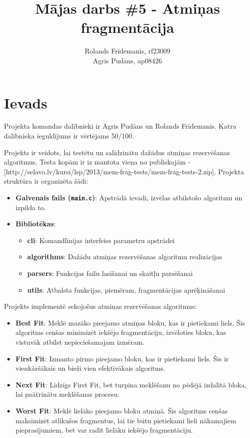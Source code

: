 \documentclass{report}
\title{Mājas darbs \#5 - Atmiņas fragmentācija}
\author{Rolands Frīdemanis, rf23009 \\ Agris Pudāns, ap08426}
\date{}
\begin{document}
	
	\maketitle
	
	\tableofcontents
	
	\section{Ievads}
	
	Projekta komandas dalībnieki ir Agris Pudāns un Rolands Frīdemanis. Katra dalībnieka ieguldījums ir vērtējams 50/100.
	
	Projekts ir veidots, lai testētu un salīdzinātu dažādus atmiņas rezervēšanas algoritmus. Testa kopām ir iz mantota viena no publiskajām - [http://selavo.lv/kursi/lsp/2013/mem-frag-tests/mem-frag-tests-2.zip]. Projekta struktūra ir organizēta šādi:
	
	\begin{itemize}
		\item \textbf{Galvenais fails (\texttt{main.c})}: Apstrādā ievadi, izvēlas atbilstošo algoritmu un izpilda to.
		\item \textbf{Bibliotēkas}:
		\begin{itemize}
			\item \textbf{cli}: Komandlīnijas interfeiss parametru apstrādei
			\item \textbf{algorithms}: Dažādu atmiņas rezervēšanas algoritmu realizācijas
			\item \textbf{parsers}: Funkcijas failu lasīšanai un skaitļu parsēšanai
			\item \textbf{utils}: Atbalsta funkcijas, piemēram, fragmentācijas aprēķināšanai
		\end{itemize}
	\end{itemize}
	
	Projekts implementē sekojošus atmiņas rezervēšanas algoritmus:
	\begin{itemize}
		\item \textbf{Best Fit}: Meklē mazāko pieejamo atmiņas bloku, kas ir pietiekami liels. Šis algoritms cenšas minimizēt iekšējo fragmentāciju, izvēloties bloku, kas vistuvāk atbilst nepieciešamajam izmēram.
		\item \textbf{First Fit}: Izmanto pirmo pieejamo bloku, kas ir pietiekami liels. Šis ir vienkāršākais un bieži vien efektīvākais algoritms.
		\item \textbf{Next Fit}: Līdzīgs First Fit, bet turpina meklēšanu no pēdējā izdalītā bloka, lai paātrinātu meklēšanas procesu.
		\item \textbf{Worst Fit}: Meklē lielāko pieejamo bloku atmiņā. Šis algoritms cenšas maksimizēt atlikušos fragmentus, lai tie būtu pietiekami lieli nākamajiem pieprasījumiem, bet var radīt lielāku iekšējo fragmentāciju.
	\end{itemize}
	
\end{document}
